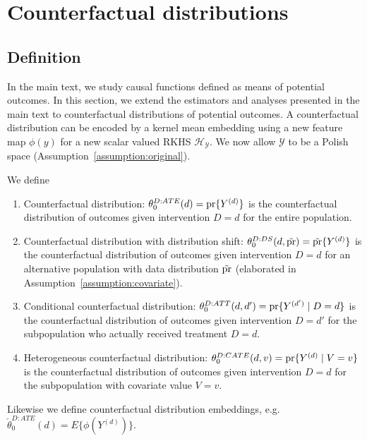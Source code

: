 \section{Counterfactual distributions}\label{sec:distribution}

\subsection{Definition}

In the main text, we study causal functions defined as means of potential outcomes. In this section, we extend the estimators and analyses presented in the main text to counterfactual distributions of potential outcomes. A counterfactual distribution can be encoded by a kernel mean embedding using a new feature map $\phi(y)$ for a new scalar valued RKHS $\mathcal{H}_{\mathcal{Y}}$. We now allow $\mathcal{Y}$ to be a Polish space (Assumption~\ref{assumption:original}).
\begin{definition} We define %
\begin{enumerate}
    \item Counterfactual distribution: $
\theta_0^{D:ATE}(d)=\text{\normalfont pr}\{Y^{(d)}\}
$ is the counterfactual distribution of outcomes given intervention $D=d$ for the entire population.
    \item Counterfactual distribution with distribution shift: $
\theta_0^{D:DS}(d,\tilde{\text{\normalfont pr}})=\tilde{\text{\normalfont pr}}\{Y^{(d)}\}
$ is the counterfactual distribution of outcomes given intervention $D=d$ for an alternative population with data distribution $\tilde{\text{\normalfont pr}}$ (elaborated in Assumption~\ref{assumption:covariate}).
    \item Conditional counterfactual distribution: $
\theta_0^{D:ATT}(d,d')=\text{\normalfont pr}\{Y^{(d')} \mid D=d\}
$ is the counterfactual distribution of outcomes given intervention $D=d'$ for the subpopulation who actually received treatment $D=d$.
    \item Heterogeneous counterfactual distribution: $
\theta_0^{D:CATE}(d,v)=\text{\normalfont pr}\{Y^{(d)} \mid V=v\}
$ is the counterfactual distribution of outcomes given intervention $D=d$ for the subpopulation with covariate value $V=v$.
\end{enumerate}
Likewise we define counterfactual distribution embeddings, e.g. $
\check{\theta}_0^{D:ATE}(d)=E\{\phi(Y^{(d)})\}.
$
\end{definition}

